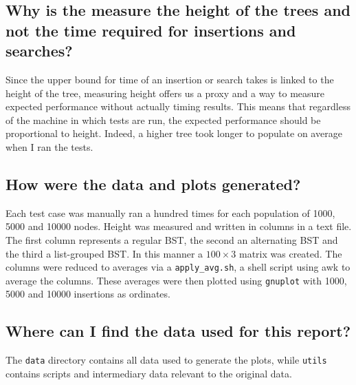 \documentclass[fleqn,10pt]{SelfArx} %
\begin{document}
\subsection*{Why is the measure the height of the trees and not the time required for insertions and searches?}
	Since the upper bound for time of an insertion or search takes is linked to the height of the tree, measuring height offers us a proxy and a way to measure expected performance without actually timing results. This means that regardless of the machine in which tests are run, the expected performance should be proportional to height. Indeed, a higher tree took longer to populate on average when I ran the tests.
	
\subsection*{How were the data and plots generated?}
Each test case was manually ran a hundred times for each population of 1000, 5000 and 10000 nodes. Height was measured and written in columns in a text file. The first column represents a regular BST, the second an alternating BST and the third a list-grouped BST. In this manner a $100 \times 3$ matrix was created. The columns were reduced to averages via a \texttt{apply\_avg.sh}, a shell script using awk to average the columns. These averages were then plotted using \texttt{gnuplot} with 1000, 5000 and 10000 insertions as ordinates.

\subsection*{Where can I find the data used for this report?}
The \texttt{data} directory contains all data used to generate the plots, while \texttt{utils} contains scripts and intermediary data relevant to the original data.



\end{document}

